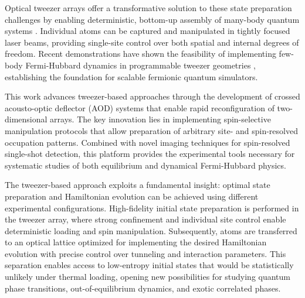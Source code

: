 Optical tweezer arrays offer a transformative solution to these state preparation challenges by enabling deterministic, bottom-up assembly of many-body quantum systems \cite{browaeys_many-body_2020}. Individual atoms can be captured and manipulated in tightly focused laser beams, providing single-site control over both spatial and internal degrees of freedom. Recent demonstrations have shown the feasibility of implementing few-body Fermi-Hubbard dynamics in programmable tweezer geometries \cite{spar_realization_2022,yan_two-dimensional_2022}, establishing the foundation for scalable fermionic quantum simulators.

This work advances tweezer-based approaches through the development of crossed acousto-optic deflector (AOD) systems that enable rapid reconfiguration of two-dimensional arrays. The key innovation lies in implementing spin-selective manipulation protocols that allow preparation of arbitrary site- and spin-resolved occupation patterns. Combined with novel imaging techniques for spin-resolved single-shot detection, this platform provides the experimental tools necessary for systematic studies of both equilibrium and dynamical Fermi-Hubbard physics.

The tweezer-based approach exploits a fundamental insight: optimal state preparation and Hamiltonian evolution can be achieved using different experimental configurations. High-fidelity initial state preparation is performed in the tweezer array, where strong confinement and individual site control enable deterministic loading and spin manipulation. Subsequently, atoms are transferred to an optical lattice optimized for implementing the desired Hamiltonian evolution with precise control over tunneling and interaction parameters. This separation enables access to low-entropy initial states that would be statistically unlikely under thermal loading, opening new possibilities for studying quantum phase transitions, out-of-equilibrium dynamics, and exotic correlated phases.